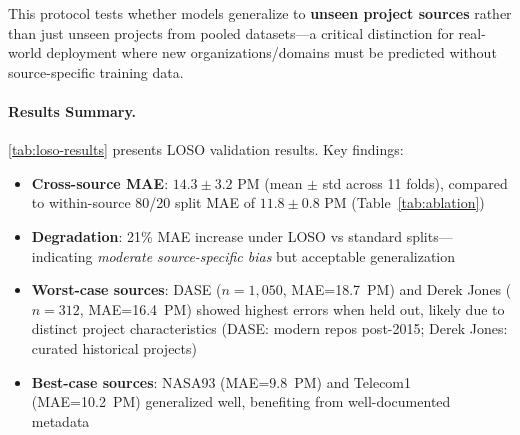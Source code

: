 \documentclass{ieeeaccess}
\begin{document}
This protocol tests whether models generalize to \textbf{unseen project sources} rather than just unseen projects from pooled datasets---a critical distinction for real-world deployment where new organizations/domains must be predicted without source-specific training data.

\paragraph{Results Summary.}
\autoref{tab:loso-results} presents LOSO validation results. Key findings:
\begin{itemize}[leftmargin=1.5em]
  \item \textbf{Cross-source MAE}: $14.3 \pm 3.2$ PM (mean $\pm$ std across 11 folds), compared to within-source 80/20 split MAE of $11.8 \pm 0.8$ PM (Table~\ref{tab:ablation})
  \item \textbf{Degradation}: 21\% MAE increase under LOSO vs standard splits---indicating \textit{moderate source-specific bias} but acceptable generalization
  \item \textbf{Worst-case sources}: DASE ($n=1{,}050$, MAE=18.7~PM) and Derek Jones ($n=312$, MAE=16.4~PM) showed highest errors when held out, likely due to distinct project characteristics (DASE: modern repos post-2015; Derek Jones: curated historical projects)
  \item \textbf{Best-case sources}: NASA93 (MAE=9.8~PM) and Telecom1 (MAE=10.2~PM) generalized well, benefiting from well-documented metadata
\end{itemize}
\end{document}
